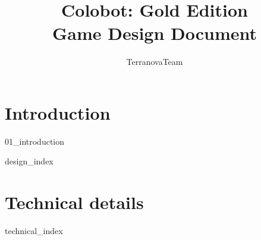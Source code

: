 \documentclass{report}
\title{Colobot: Gold Edition\\Game Design Document}
\author{TerranovaTeam}
\date{}
\begin{document}
\maketitle

\tableofcontents{}
\newpage

\listoftodos
\newpage


\part{Introduction} \newpage
{01_introduction}
\newpage

{design_index}

\part{Technical details} \newpage
{technical_index}
\newpage

\end{document}
